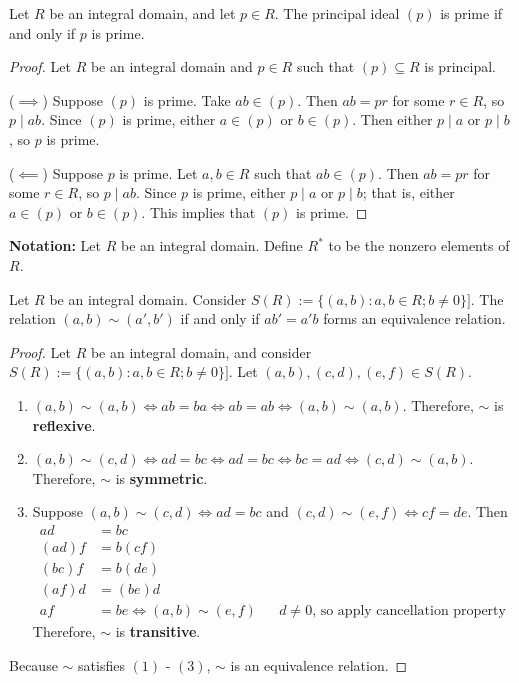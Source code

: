 \documentclass [12pt] {article}
\newenvironment{theorem}[1]{\begin{tcolorbox}[title={Theorem #1},colback=green!5!white,colframe=black!75!green]}{\end{tcolorbox}}
\newenvironment{lemma}[1]{\begin{tcolorbox}[title={Lemma #1}]}{\end{tcolorbox}}
\renewcommand{\bf}[1]{\textbf{{#1}}}
\begin{document}
\begin{theorem}{}
Let $R$ be an integral domain, and let $p \in R$. The principal ideal $(p)$ is prime if and only if
$p$ is prime.
\end{theorem}
\begin{proof}
    Let $R$ be an integral domain and $p \in R$ such that $(p) \subseteq R$ is principal.
    \vspace{0.5em}

    ($\implies$)
    Suppose $(p)$ is prime. Take $ab \in (p)$. Then $ab = pr$ for some $r \in R$, so $p \mid ab$.
    Since $(p)$ is prime, either $a \in (p)$ or $b \in (p)$. Then either $p \mid a$ or $p \mid b$,
    so $p$ is prime.
    \vspace{0.5em}

    ($\impliedby$)
    Suppose $p$ is prime. Let $a, b \in R$ such that  $ab \in (p)$. Then $ab = pr$ for some
    $r \in R$, so $p \mid ab$. Since $p$ is prime, either $p \mid a$ or $p \mid b$; that is,
    either $a \in (p)$ or $b \in (p)$. This implies that $(p)$ is prime.
\end{proof}

\bf{Notation:} Let $R$ be an integral domain. Define $R^*$ to be the nonzero elements of $R$.

\newpage
\begin{lemma}{}
    Let $R$ be an integral domain. Consider $S(R) := \{ (a, b) : a, b \in R; b \neq 0 \}]$. The
    relation $(a, b) \sim (a', b')$ if and only if $ab' = a'b$ forms an equivalence relation.
\end{lemma}
\begin{proof}
    Let $R$ be an integral domain, and consider $S(R) := \{ (a, b) : a, b \in R; b \neq 0 \}]$. Let
    $(a, b), (c, d), (e, f) \in S(R)$.
    \begin{enumerate}[label=(\arabic*)]
        \item $(a, b) \sim (a, b) \iff ab = ba \iff  ab = ab \iff (a, b) \sim (a, b)$. Therefore,
            $\sim$ is \bf{reflexive}.
        \item $(a, b) \sim (c, d) \iff ad = bc \iff ad = bc \iff bc = ad \iff (c, d) \sim (a, b)$.
            Therefore, $\sim$ is \bf{symmetric}.
        \item Suppose $(a, b) \sim (c, d) \iff ad = bc$ and $(c, d) \sim (e, f) \iff cf = de$.
            Then
            \begin{align*}
                ad &= bc \\
                (ad)f &= b(cf) \\
                (bc)f &= b(de) \\
                (af)d &= (be)d \\
                af &= be \iff (a, b) \sim (e, f) && d \neq 0 \text{, so apply cancellation property}
            \end{align*}
            Therefore, $\sim$ is \bf{transitive}.
    \end{enumerate}
    Because $\sim$ satisfies $(1)$ - $(3)$, $\sim$ is an equivalence relation.
\end{proof}
\end{document}
